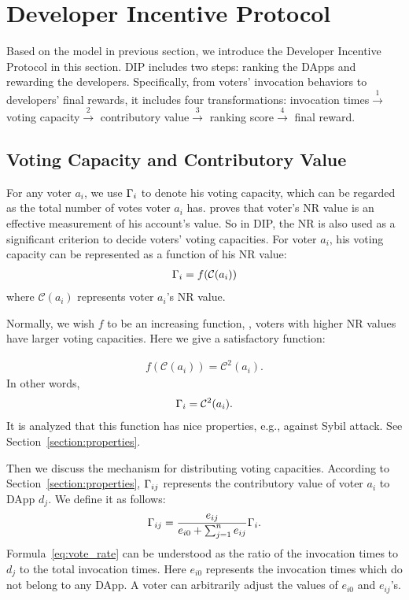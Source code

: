 \section{Developer Incentive Protocol}
\noindent Based on the model in previous section, we introduce the Developer
Incentive Protocol in this section. DIP includes two steps: ranking the DApps
and rewarding the developers. Specifically, from voters' invocation behaviors
to developers' final rewards, it includes four transformations: invocation
times$\overset{1}{\rightarrow}$ voting capacity$\overset{2}{\rightarrow}$ contributory
value$\overset{3}{\rightarrow}$ ranking score$\overset{4}{\rightarrow}$ final reward.

\subsection{Voting Capacity and Contributory Value}
\noindent For any voter $a_i$, we use $\Gamma_i$ to denote his voting capacity, which can be regarded as the total number of votes voter $a_i$ has. \cite{Nebulasyellowpaper} proves that voter's NR value is an effective measurement of his account's value. So in DIP, the NR is also used as a significant criterion to decide voters' voting capacities. For voter $a_i$, his voting capacity can be represented as a function of his NR value:
\begin{align}
	\Gamma_i = f(\mathcal{C}(a_i))
\end{align}
where $\mathcal{C}(a_i)$ represents voter $a_i$'s NR value.


Normally, we wish $f$ to be an increasing function, \ie, voters with higher NR
values have larger voting capacities. Here we give a satisfactory function:

\begin{align}
	\label{eq:capacity}
	f(\mathcal{C}(a_i))=\mathcal{C}^2(a_i).
\end{align}
In other words,
\begin{align}
	\Gamma_i = \mathcal{C}^2(a_i).
\end{align}
It is analyzed that this function has nice properties, e.g., against Sybil attack. See Section~\ref{section:properties}.

Then we discuss the mechanism for  distributing voting capacities. According to Section~\ref{section:properties}, $\Gamma_{ij}$ represents the contributory value of voter $a_i$ to DApp $d_j$. We define it as follows:
\begin{align}
	\label{eq:vote_rate}
	\Gamma_{ij} = \frac{e_{ij}}{e_{i0}+\sum_{j=1}^n {e_{ij}}} \Gamma_i.
\end{align}
Formula~\ref{eq:vote_rate} can be understood as the ratio of the invocation
times to $d_j$ to the total invocation times. Here $e_{i0}$ represents the
invocation times which do not belong to any DApp. A voter can arbitrarily adjust the values of $e_{i0}$ and $e_{ij}$'s.

